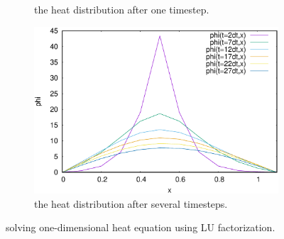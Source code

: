 \begin{figure}
\begin{subfigure}[b]{0.45\textwidth}
		\caption{the heat distribution after one timestep.}
         \label{fig:1d-1dt}
     \end{subfigure}
     \begin{subfigure}[b]{0.5\textwidth}
         \centering
         \includegraphics[width=\textwidth]{1Dfig/result1D}
		 \caption{the heat distribution after several timesteps.}
		\label{fig:1d-tdt}
     \end{subfigure}
     
        \caption{solving one-dimensional heat equation using LU factorization.}
        \label{fig:1d-du}
\end{figure}



